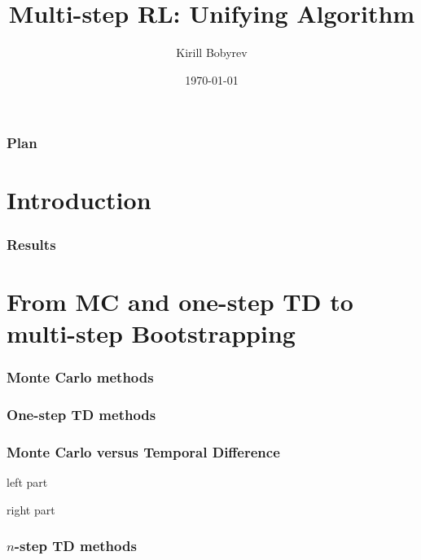 \documentclass{beamer}
\title{Multi-step RL: Unifying Algorithm}
\author{Kirill Bobyrev}
\date{\today}
\begin{document}
\begin{frame}
  \titlepage
\end{frame}

\begin{frame}
  \frametitle{Plan}
  \tableofcontents
\end{frame}


\section{Introduction}

\begin{frame}
  \frametitle{Results}
\end{frame}

\section{From MC and one-step TD to multi-step Bootstrapping}

\begin{frame}
  \frametitle{Monte Carlo methods}
\end{frame}

\begin{frame}
  \frametitle{One-step TD methods}
\end{frame}

\begin{frame}
  \frametitle{Monte Carlo versus Temporal Difference}
  \begin{minipage}[t]{0.48\linewidth}
    left part
  \end{minipage}
  \hfill\vline\hfill
  \begin{minipage}[t]{0.48\linewidth}
    right part
  \end{minipage}
\end{frame}

\begin{frame}
  \frametitle{$n$-step TD methods}
\end{frame}
\end{document}
